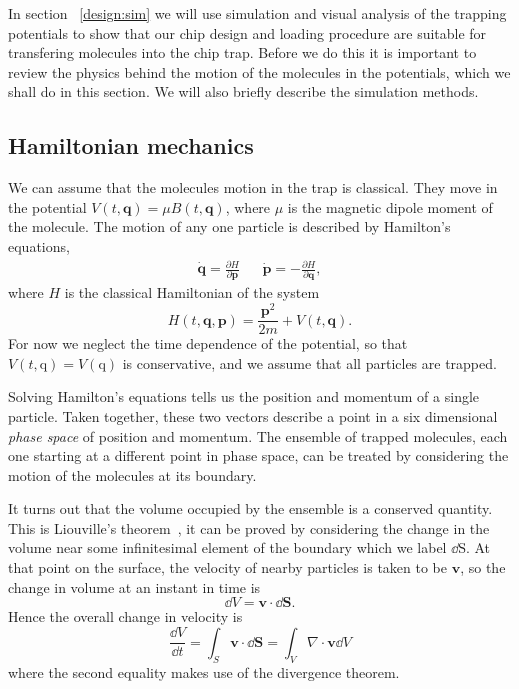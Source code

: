 In section ~\ref{design:sim} we will use simulation and visual analysis of the
trapping potentials to show that our chip design and loading procedure are
suitable for transfering molecules into the chip trap. Before we do this it is
important to review the physics behind the motion of the molecules in the
potentials, which we shall do in this section. We will also briefly describe
the simulation methods.

\subsection{Hamiltonian mechanics}

We can assume that the molecules motion in the trap is classical. They move in
the potential $V(t, \mathbf{q}) = \mu B(t, \mathbf{q})$, where $\mu$ is the
magnetic dipole moment of the molecule.  The motion of any one particle is
described by Hamilton's equations,~\cite{Lichtenberg1969}
%
\begin{align}
  \label{design:eq:hamilton}
  \dot{\mathbf{q}} =  \frac{\partial H}{\partial \mathbf{p}} &&
  \dot{\mathbf{p}} = -\frac{\partial H}{\partial \mathbf{q}},
\end{align}
%
where $H$ is the classical Hamiltonian of the system
\begin{equation}
  H(t, \mathbf{q}, \mathbf{p}) = \frac{\mathbf{p}^2}{2m} + V(t, \mathbf{q}).
\end{equation}
For now we neglect the time dependence of the potential, so that $V(t,
\mathrm{q}) = V(\mathrm{q})$ is conservative, and we assume that all particles
are trapped.

Solving Hamilton's equations tells us the position and momentum of a single
particle. Taken together, these two vectors describe a point in a six
dimensional \emph{phase space} of position and momentum. The ensemble of
trapped molecules, each one starting at a different point in phase space, can
be treated by considering the motion of the molecules at its
boundary.~\cite{Hand1998}

It turns out that the volume occupied by the ensemble is a conserved quantity.
This is Liouville's theorem~\cite{Landau1982}, it can be proved by considering
the change in the volume near some infinitesimal element of the boundary which
we label $\dd \mathrm{S}$. At that point on the surface, the velocity of nearby
particles is taken to be $\mathbf{v}$, so the change in volume at an instant in
time is~\cite{Hand1998}
%
\begin{equation}
  \dd V = \mathbf{v} \cdot \dd \mathbf{S}.
\end{equation}
%
Hence the overall change in velocity is
%
\begin{equation}
  \frac{\dd V}{\dd t} = \int_S \mathbf{v} \cdot \dd \mathbf{S} = \int_V \nabla 
  \cdot \mathbf{v} \dd V
\end{equation}
where the second equality makes use of the divergence theorem.

